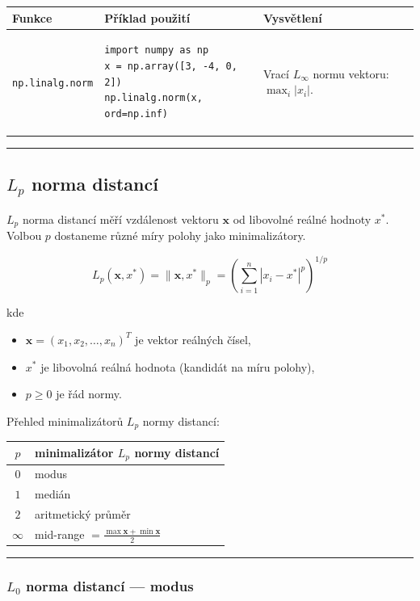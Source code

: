 \documentclass[a4paper, 11pt]{article}
\newenvironment{funkcedict}
{%
  \begingroup
  \renewcommand{\arraystretch}{1.4}%
  \lstset{basicstyle=\ttfamily\small, columns=fullflexible}%
  \setlength{\tabcolsep}{4pt}%
  \begin{tabular}{p{0.19\textwidth} p{0.38\textwidth} p{0.30\textwidth}}
  \textbf{Funkce} & \textbf{Příklad použití} & \textbf{Vysvětlení} \\
  \midrule
}
{%
  \end{tabular}%
  \endgroup
}
\begin{document}
\begin{funkcedict}
	\texttt{np.linalg.norm} &
	\begin{lstlisting}
import numpy as np
x = np.array([3, -4, 0, 2])
np.linalg.norm(x, ord=np.inf)
	\end{lstlisting}
	&
	Vrací $L_\infty$ normu vektoru: $\max_i |x_i|$. \\
\end{funkcedict}

\noindent\hrule\medskip

\subsection{$L_p$ norma distancí}

$L_p$ norma distancí měří vzdálenost vektoru $\mathbf{x}$ od libovolné
reálné hodnoty $x^*$. Volbou $p$ dostaneme různé míry polohy jako minimalizátory.

\begin{equation*}
	L_p(\mathbf{x}, x^*) = \|\mathbf{x}, x^*\|_p = \left(\sum_{i=1}^{n} |x_i - x^*|^p\right)^{1/p}
\end{equation*}

kde

\begin{itemize}[noitemsep]
	\item $\mathbf{x} = (x_1, x_2, \ldots, x_n)^T$ je vektor reálných čísel,
	\item $x^*$ je libovolná reálná hodnota (kandidát na míru polohy),
	\item $p \geq 0$ je řád normy.
\end{itemize}

Přehled minimalizátorů $L_p$ normy distancí:

\begin{center}
\renewcommand{\arraystretch}{1.3}
\begin{tabular}{cl}
	\toprule
	$p$ & minimalizátor $L_p$ normy distancí \\
	\midrule
	$0$ & modus \\
	$1$ & medián \\
	$2$ & aritmetický průměr \\
	$\infty$ & mid-range $= \frac{\max \mathbf{x} + \min \mathbf{x}}{2}$ \\
	\bottomrule
\end{tabular}
\end{center}

\noindent\hrule\medskip

\subsubsection{$L_0$ norma distancí --- modus}
\end{document}
